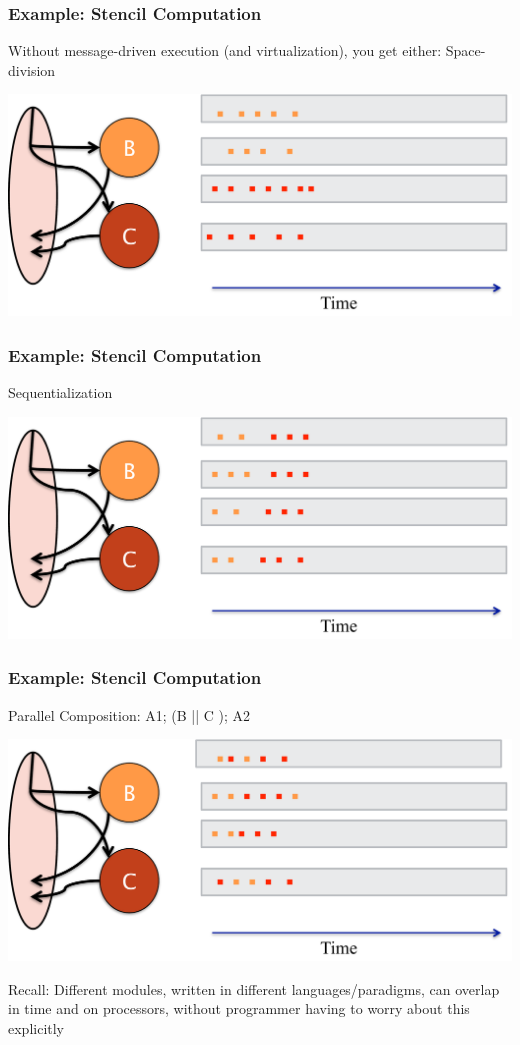\begin{frame}[t]
\frametitle{Example: Stencil Computation}
Without message-driven execution (and virtualization), you get either: Space-division

  \begin{center} \includegraphics[width=\textwidth]{figures/stencil_space} \end{center}
\end{frame}

\begin{frame}[t]
\frametitle{Example: Stencil Computation}
Sequentialization

  \begin{center} \includegraphics[width=\textwidth]{figures/stencil_seq} \end{center}
\end{frame}

\begin{frame}[t]
\frametitle{Example: Stencil Computation}
Parallel Composition: A1; (B || C ); A2
  \begin{center} \includegraphics[width=\textwidth]{figures/stencil_charm} \end{center}
Recall: Different modules, written in different languages/paradigms, can overlap
in time and on processors, without programmer having to worry about this
explicitly

\end{frame}

